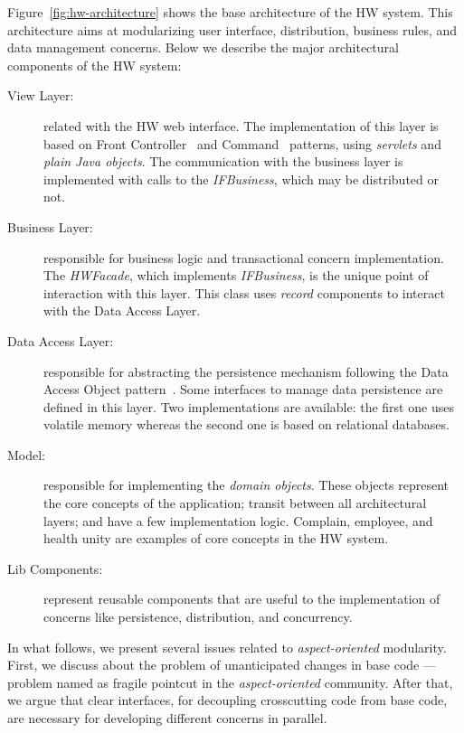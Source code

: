 Figure~\ref{fig:hw-architecture} shows the base architecture of the
HW system. This architecture aims at modularizing user interface,
distribution, business rules, and data management concerns. Below
we describe the major architectural components of the HW system:

\begin{description}

\item [View Layer:] related with the HW web interface. The
implementation of this layer is based on Front
Controller~\cite{alur-book-2003} and
Command~\cite{gamma-dpbook-1995} patterns, using \emph{servlets}
and \emph{plain Java objects}. The communication with the business layer
is implemented with calls to the \emph{IFBusiness}, which may be
distributed or not.

\item [Business Layer:] responsible for business
logic and transactional concern implementation. The
\emph{HWFacade}, which implements \emph{IFBusiness}, is the unique
point of interaction with this layer. This class uses
\emph{record} components to interact with the Data Access Layer.

\item [Data Access Layer:] responsible for abstracting the persistence
mechanism following the Data Access Object
pattern~\cite{alur-book-2003}. Some interfaces to
manage data persistence are defined in this layer. Two
implementations are available: the first one uses volatile memory
whereas the second one is based on relational databases.

\item [Model:] responsible for implementing the \emph{domain objects}.
These objects represent the core concepts of the application;
transit between all architectural layers; and have a few
implementation logic. Complain, employee, and health unity are examples of 
core concepts in the HW system. 

\item [Lib Components:] represent reusable components that are useful
to the implementation of concerns like persistence, distribution,
and concurrency.
\end{description}

In what follows, we present several issues related to \emph{aspect-oriented} 
modularity. First, we discuss about the problem of unanticipated changes 
in base code --- problem named as fragile pointcut in the \emph{aspect-oriented} community. After that, 
we argue that clear interfaces, for decoupling crosscutting code from base 
code, are necessary for developing different concerns in parallel.    

